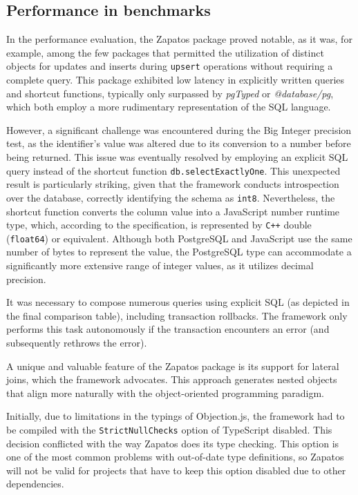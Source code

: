 \subsection{Performance in benchmarks}

In the performance evaluation, the Zapatos package proved notable, as it was,
for example, among the few packages that permitted the utilization of distinct
objects for updates and inserts during \texttt{upsert} operations without
requiring a complete query. This package exhibited low latency in explicitly
written queries and shortcut functions, typically only surpassed by
\textit{pgTyped} or \textit{@database/pg}, which both employ a more rudimentary
representation of the SQL language.

However, a significant challenge was encountered during the Big Integer
precision test, as the identifier's value was altered due to its conversion to a
number before being returned. This issue was eventually resolved by employing an
explicit SQL query instead of the shortcut function
\texttt{db.selectExactlyOne}. This unexpected result is particularly striking,
given that the framework conducts introspection over the database, correctly
identifying the schema as \texttt{int8}. Nevertheless, the shortcut function
converts the column value into a JavaScript number runtime type, which,
according to the specification, is represented by \texttt{C++} double
(\texttt{float64}) or equivalent. Although both PostgreSQL and JavaScript use
the same number of bytes to represent the value, the PostgreSQL type can
accommodate a significantly more extensive range of integer values, as it
utilizes decimal precision.

It was necessary to compose numerous queries using explicit SQL (as depicted in
the final comparison table), including transaction rollbacks. The framework only
performs this task autonomously if the transaction encounters an error (and
subsequently rethrows the error).

A unique and valuable feature of the Zapatos package is its support for lateral
joins, which the framework advocates. This approach generates nested objects
that align more naturally with the object-oriented programming paradigm.

Initially, due to limitations in the typings of Objection.js, the framework had
to be compiled with the \texttt{StrictNullChecks} option of TypeScript disabled. This
decision conflicted with the way Zapatos does its type checking. This option is
one of the most common problems with out-of-date type definitions, so Zapatos
will not be valid for projects that have to keep this option disabled due to
other dependencies.